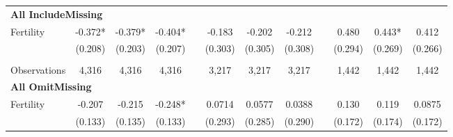 \begin{landscape}
\begin{table}[htpb!]
\begin{center}
\begin{tabular}{lcccp{2mm}cccp{2mm}ccc}
\multicolumn{12}{l}{\textbf{All IncludeMissing}}\\ 
Fertility&-0.372*&-0.379*&-0.404*&&-0.183&-0.202&-0.212&&0.480&0.443*&0.412\\
&(0.208)&(0.203)&(0.207)&&(0.303)&(0.305)&(0.308)&&(0.294)&(0.269)&(0.266)\\
\begin{footnotesize}\end{footnotesize}&\begin{footnotesize}\end{footnotesize}&\begin{footnotesize}\end{footnotesize}&\begin{footnotesize}\end{footnotesize}&\begin{footnotesize}\end{footnotesize}&\begin{footnotesize}\end{footnotesize}&\begin{footnotesize}\end{footnotesize}&\begin{footnotesize}\end{footnotesize}&\begin{footnotesize}\end{footnotesize}&\begin{footnotesize}\end{footnotesize}&\begin{footnotesize}\end{footnotesize}&\begin{footnotesize}\end{footnotesize}\\Observations&4,316&4,316&4,316&&3,217&3,217&3,217&&1,442&1,442&1,442\\
\multicolumn{12}{l}{\textbf{All OmitMissing}}\\ 
Fertility&-0.207&-0.215&-0.248*&&0.0714&0.0577&0.0388&&0.130&0.119&0.0875\\
&(0.133)&(0.135)&(0.133)&&(0.293)&(0.285)&(0.290)&&(0.172)&(0.174)&(0.172)\\

\end{tabular}
\end{center}
\end{table}
\end{landscape}
